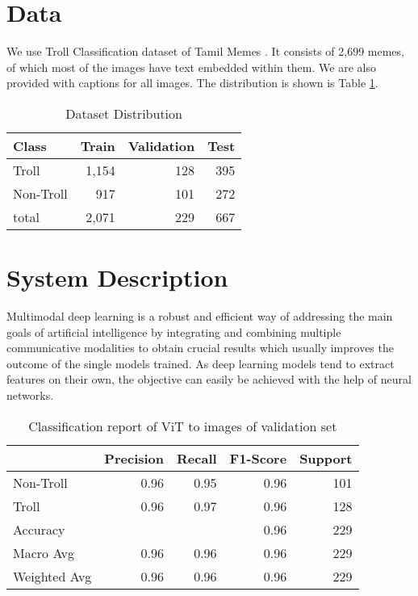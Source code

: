 \documentclass[11pt,a4paper]{article}
\begin{document}
 
\section{Data}
\label{data}
We use Troll Classification dataset of Tamil Memes \cite{suryawanshi-etal-2020-dataset}. It consists of 2,699 memes, of which most of the images have text embedded within them. We are also provided with captions for all images. The distribution is shown is Table \ref{tab1}.

\begin{table}[!h]
\begin{center}
\renewcommand{\tabcolsep}{3mm}
\begin{tabular}{|l|r|r|r|}
\hline
Class &  Train & Validation & Test\\
\hline
Troll & 1,154 & 128 & 395\\
Non-Troll & 917 & 101 & 272\\ 
\hline
total & 2,071 & 229 & 667 \\
\hline
\end{tabular}
\end{center}
\caption{Dataset Distribution}\label{tab1}
\end{table}

\section{System Description}
\label{system description}
Multimodal deep learning is a robust and efficient way of addressing the main goals of artificial intelligence by integrating and combining multiple communicative modalities to obtain crucial results which usually improves the outcome of the single models trained. As deep learning models tend to extract features on their own, the objective can easily be achieved with the help of neural networks. 

\begin{table*}[!h]
\begin{center}
\renewcommand{\tabcolsep}{3mm}
\begin{tabular}{l|r|r|r|r}
\hline
 & Precision & Recall & F1-Score & Support\\
\hline
Non-Troll & 0.96 & 0.95 & 0.96 & 101\\
Troll & 0.96 & 0.97 & 0.96 & 128\\ 
\hline
Accuracy & & & 0.96 & 229\\
Macro Avg & 0.96 & 0.96 & 0.96 & 229 \\
Weighted Avg & 0.96 & 0.96 & 0.96 & 229\\
\hline
\end{tabular}
\end{center}
\caption{Classification report of ViT to images of validation set}\label{tab2}
\end{table*}
\end{document}
